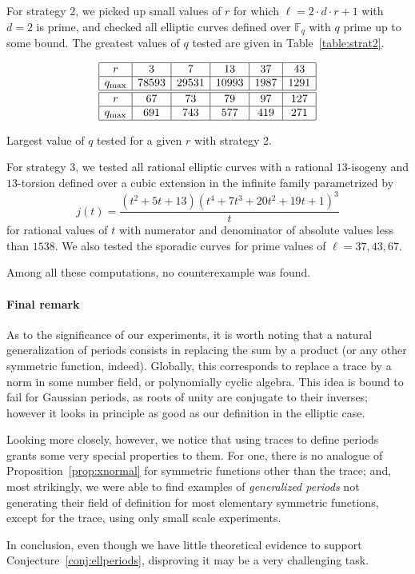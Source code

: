 \documentclass[12pt]{article}
\theoremstyle{plain}
\theoremstyle{definition}
\def\F{\ensuremath{\mathbb{F}}}
\begin{document}
For strategy 2, we picked up small values of $r$ for which
$\ell = 2 \cdot d \cdot r + 1$ with $d = 2$ is prime,
and checked all elliptic curves defined over $\F_q$ with $q$ prime up
to some bound.
The greatest values of $q$ tested are given in Table~\ref{table:strat2}.
\begin{table}[!ht]
\[
\begin{array}{|*{6}{c|}}
\hline
r & 3 & 7 & 13 & 37 & 43 \\
\hline
q_{\max} & 78593 & 29531 & 10993 & 1987 & 1291 \\
\hline
\hline
r & 67 & 73 & 79 & 97 & 127 \\
\hline
q_{\max} & 691 & 743 & 577 & 419 & 271 \\
\hline
\end{array}
\]
\caption{Largest value of $q$ tested for a given $r$ with strategy 2.}
\label{table:strat2}
\end{table}

For strategy 3, we tested all rational elliptic curves
with a rational $13$-isogeny and $13$-torsion defined over a cubic extension
in the infinite family parametrized by
\[
j(t) = \frac{\left(t^2 + 5t + 13\right)\left(t^4 + 7t^3 + 20t^2 + 19t + 1\right)^3}{t}
\]
for rational values of $t$ with numerator and denominator of absolute values
less than $1538$.
We also tested the sporadic curves for prime values of $\ell = 37, 43, 67$.

Among all these computations, no counterexample was found.

\paragraph{Final remark}
As to the significance of our experiments, it is worth noting that a
natural generalization of periods consists in replacing the sum by a
product (or any other symmetric function, indeed). %
Globally, this corresponds to replace a trace by a norm in some number
field, or polynomially cyclic algebra. %
This idea is bound to fail for Gaussian periods, as roots of unity are
conjugate to their inverses; however it looks in principle as good as
our definition in the elliptic case.

Looking more closely, however, we notice that using traces to define
periods grants some very special properties to them. %
For one, there is no analogue of Proposition~\ref{prop:xnormal} for
symmetric functions other than the trace; and, most strikingly, we
were able to find examples of \emph{generalized periods} not
generating their field of definition for most elementary symmetric
functions, except for the trace, using only small scale experiments.

In conclusion, even though we have little theoretical evidence to
support Conjecture~\ref{conj:ellperiods}, disproving it may be a very
challenging task.





\end{document}
